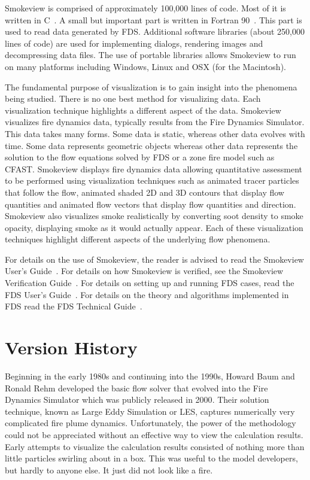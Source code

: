\documentclass[11pt,twoside]{book}
\begin{document}
Smokeview is comprised of approximately 100,000 lines of code.
Most of it is written in C~\cite{C:book}. A small but important
part is written in Fortran 90~\cite{Fortran:book}.  This part is
used to read data generated by FDS.  Additional software libraries
(about 250,000 lines of code) are used for implementing dialogs,
rendering images and decompressing data files. The use of portable
libraries allows Smokeview to run on many platforms including
Windows, Linux and OSX (for the Macintosh).

The fundamental purpose of visualization is to gain insight into
the phenomena being studied. There is no one best method for
visualizing data. Each visualization technique highlights a
different aspect of the data. Smokeview visualizes fire dynamics
data, typically results from the Fire Dynamics Simulator. This
data takes many forms.  Some data is static, whereas other data
evolves with time. Some data represents geometric objects whereas
other data represents the solution to the flow equations solved by
FDS or a zone fire model such as CFAST. Smokeview displays fire
dynamics data allowing quantitative assessment to be performed
using visualization techniques such as animated tracer particles
that follow the flow, animated shaded 2D and 3D contours that
display flow quantities and animated flow vectors that display
flow quantities and direction. Smokeview also visualizes smoke
realistically by converting soot density to smoke opacity,
displaying smoke as it would actually appear. Each of these
visualization techniques highlight different aspects of the
underlying flow phenomena.

For details on the use of Smokeview, the reader is advised to read
the Smokeview User's Guide~\cite{Smokeview_Users_Guide}. For
details on how Smokeview is verified, see the Smokeview
Verification Guide~\cite{Smokeview_Verification_Guide}.  For
details on setting up and running FDS cases, read the FDS User's
Guide~\cite{FDS_Users_Guide}.  For details on the theory and
algorithms implemented in FDS read the FDS Technical
Guide~\cite{FDS_Tech_Guide}.

%
%

\section{Version History}

Beginning in the early 1980s and continuing into the 1990s, Howard
Baum and Ronald Rehm developed the basic flow solver that evolved
into the Fire Dynamics Simulator which was publicly released in
2000\cite{McGrattan:6}.  Their solution technique, known as Large
Eddy Simulation or LES, captures numerically very complicated fire
plume dynamics.  Unfortunately, the power of the methodology could
not be appreciated without an effective way to view the
calculation results.  Early attempts to visualize the calculation
results consisted of nothing more than little particles swirling
about in a box.  This was useful to the model developers, but
hardly to anyone else.  It just did not look like a fire.
\end{document}
